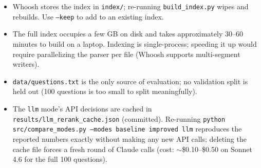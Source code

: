 \documentclass[11pt]{article}
\begin{document}
\begin{itemize}
  \item Whoosh stores the index in \texttt{index/}; re-running
        \texttt{build\_index.py} wipes and rebuilds. Use \texttt{--keep} to add
        to an existing index.
  \item The full index occupies a few GB on disk and takes approximately
        30--60 minutes to build on a laptop. Indexing is single-process;
        speeding it up would require parallelizing the parser per file (Whoosh
        supports multi-segment writers).
  \item \texttt{data/questions.txt} is the only source of evaluation; no
        validation split is held out (100 questions is too small to split
        meaningfully).
  \item The \texttt{llm} mode's API decisions are cached in
        \texttt{results/llm\_rerank\_cache.json} (committed). Re-running
        \texttt{python src/compare\_modes.py --modes baseline improved llm}
        reproduces the reported numbers exactly without making any new
        API calls; deleting the cache file forces a fresh round of
        Claude calls (cost: $\sim$\$0.10--\$0.50 on Sonnet 4.6 for the
        full 100 questions).
\end{itemize}
\end{document}
